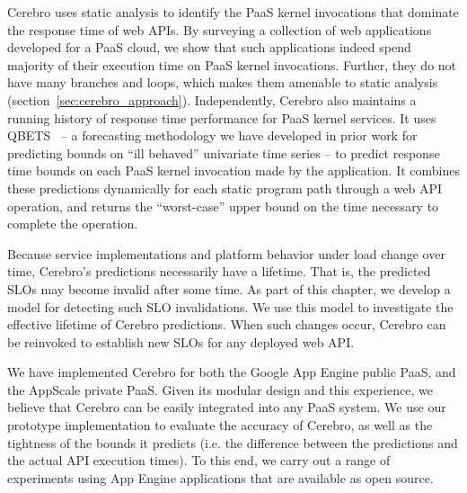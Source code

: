 Cerebro uses static analysis to identify the PaaS kernel invocations
that dominate the response time of web APIs. By surveying a collection of
web applications developed for a PaaS cloud, we show
that such applications indeed spend majority of their execution time on PaaS kernel
invocations. Further, they do not have many branches and loops, which
makes them amenable to static analysis (section~\ref{sec:cerebro_approach}). Independently,
Cerebro also maintains a running history of response time 
performance for PaaS kernel services.  It uses
QBETS~\cite{Nurmi:2007:QQB:1791551.1791556} -- a forecasting methodology
we have developed in prior work for predicting bounds on ``ill behaved''
univariate time series -- to predict response time bounds on each PaaS kernel
invocation made by the application.  It combines these predictions dynamically
for each static program path through a web API operation,
and returns the ``worst-case''
upper bound on the time necessary to 
complete the operation.


Because service implementations and platform behavior under load change over time,
Cerebro's predictions necessarily have a lifetime. That is, the predicted SLOs may
become invalid after some time.  
As part of this chapter, we develop a model for detecting such SLO invalidations. 
We use this model to investigate
the effective lifetime of Cerebro predictions. When such changes occur,
Cerebro can be reinvoked to establish new SLOs for any deployed web API.  %

We have implemented Cerebro for both the Google App Engine public PaaS, and 
the AppScale private PaaS. Given its modular design and this experience, 
we believe that Cerebro can be easily integrated into any PaaS system.
We use our prototype implementation to evaluate the accuracy of Cerebro, 
as well as the tightness
of the bounds it predicts (i.e. the difference between the predictions and 
the actual API execution times). To this end, we carry out a range of experiments
 using App Engine applications that are available as open source.  

